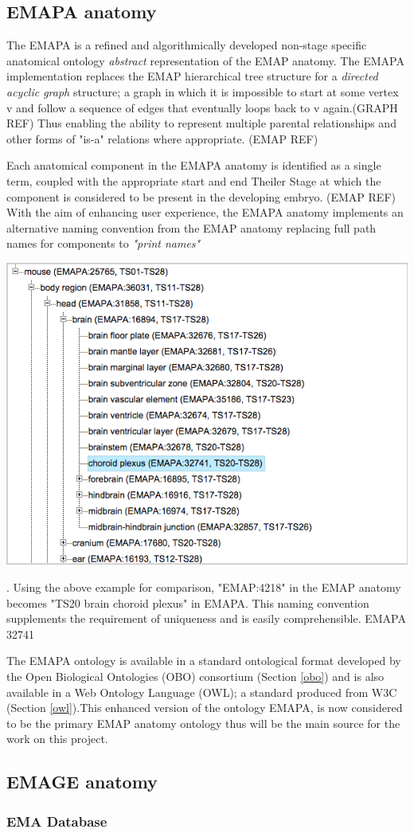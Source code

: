\subsection{EMAPA anatomy}\label{emapaanatomy}
The EMAPA is a refined and algorithmically developed non-stage specific anatomical ontology \textit{abstract} representation of the EMAP anatomy. The EMAPA implementation replaces the EMAP hierarchical tree structure for a \textit{directed acyclic graph} structure; a graph in which it is impossible to start at some vertex v and follow a sequence of edges that eventually loops back to v again.(GRAPH REF) Thus enabling the ability to represent multiple parental relationships and other forms of "is-a" relations where appropriate. (EMAP REF)

Each anatomical component in the EMAPA anatomy is identified as a single term, coupled with the appropriate start and end Theiler Stage at which the component is considered to be present in the developing embryo. (EMAP REF) With the aim of enhancing user experience, the EMAPA anatomy  implements an alternative naming convention from the EMAP anatomy replacing full path names for components to \textit{"print names"}\begin{center}\includegraphics[width=1\linewidth]{images/emapachoroidplexus}\end{center}. Using the above example for comparison, "EMAP:4218" in the EMAP anatomy becomes "TS20 brain choroid plexus" in EMAPA. This naming convention supplements the requirement of uniqueness and is easily comprehensible. EMAPA 32741  

The EMAPA ontology is available in a standard ontological format developed by the Open Biological Ontologies (OBO) consortium (Section \ref{obo}) and is also available in a Web Ontology Language (OWL); a standard produced from W3C (Section \ref{owl}).This enhanced version of the ontology EMAPA, is now considered to be the primary EMAP anatomy ontology thus will be the main source for the work on this project.


\subsection{EMAGE anatomy}

\subsubsection{EMA Database}\label{emadb}



